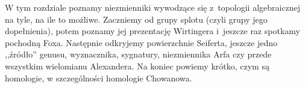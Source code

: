 
W tym rozdziale poznamy niezmienniki wywodzące się z~topologii algebraicznej na tyle, na ile to możliwe.
Zaczniemy od grupy splotu (czyli grupy jego dopełnienia), potem poznamy jej prezentację Wirtingera i~jeszcze raz spotkamy pochodną Foxa.
Następnie odkryjemy powierzchnie Seiferta, jeszcze jedno ,,źródło'' genusu, wyznacznika, sygnatury, niezmiennika Arfa czy przede wszystkim wielomianu Alexandera.
Na koniec powiemy krótko, czym są homologie, w szczególności homologie Chowanowa.


